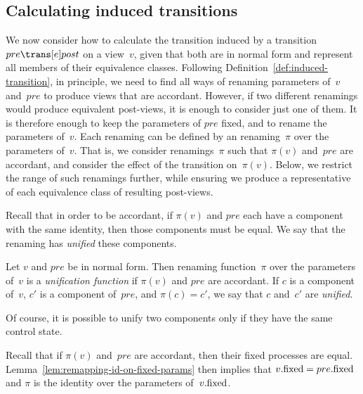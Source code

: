\subsection{Calculating induced transitions}
\label{sec:induced-symmetry}

We now consider how to calculate the transition induced
by a transition $pre \trans[e] post$ on a view~$v$, given that both are in
normal form and represent all members of their equivalence classes.  
%
Following Definition~\ref{def:induced-transition}, in principle, we need to
find all ways of renaming parameters of~$v$ and~$pre$ to produce views that
are accordant.  However, if two different renamings would produce equivalent
post-views, it is enough to consider just one of them.  It is therefore enough
to keep the parameters of $pre$ fixed, and to rename the parameters of~$v$.
Each renaming can be defined by an renaming~$\pi$ over the parameters of~$v$.
That is, we consider renamings~$\pi$ such that $\pi(v)$ and~$pre$ are
accordant, and consider the effect of the transition on~$\pi(v)$.
%
Below, we restrict the range of such renamings further, while ensuring we
produce a representative of each equivalence class of resulting post-views.



Recall that in order to be accordant, if $\pi(v)$ and $pre$ each have a
component with the same identity, then those components must be equal.  We say
that the renaming has \emph{unified} these components.
%
\begin{definition}
Let $v$ and $pre$ be in normal form.  Then renaming function~$\pi$ over the
parameters of~$v$ is a \emph{unification function} if $\pi(v)$ and $pre$ are
accordant.
%
If $c$ is a component of~$v$, $c'$ is a component of~$pre$, and $\pi(c) = c'$,
we say that $c$ and~$c'$ are \emph{unified}.
\end{definition}
%
Of course, it is possible to unify two components only if they have the same
control state. 

Recall that if $\pi(v)$ and~$pre$ are accordant, then their fixed processes
are equal.  Lemma~\ref{lem:remapping-id-on-fixed-params} then implies that
$v.\mathrm{fixed} = pre.\mathrm{fixed}$ and $\pi$ is the identity over the parameters
of~$v.\mathrm{fixed}$.


